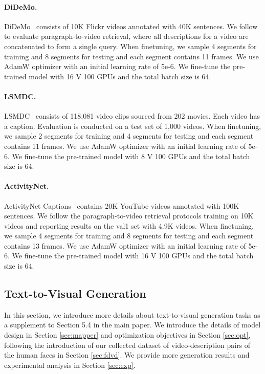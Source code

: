 \paragraph{DiDeMo.} DiDeMo~\cite{anne2017localizing} consists of 10K Flickr videos annotated with
40K sentences. We follow~\cite{liu2019use, zhang2018cross} to evaluate paragraph-to-video retrieval, where all descriptions for a video are concatenated to form a single query. When finetuning, we sample 4 segments for training and 8 segments for testing and each segment contains 11 frames. We use AdamW optimizer with an initial learning rate of 5e-6. We fine-tune the pre-trained model with 16 V 100 GPUs and the total batch size is 64.

\paragraph{LSMDC.} LSMDC~\cite{Rohrbach2016MovieD} consists of 118,081 video clips sourced from 202 movies. Each video has a caption. Evaluation is conducted on a test set of 1,000 videos. When finetuning, we sample 2 segments for training and 4 segments for testing and each segment contains 11 frames. We use AdamW optimizer with an initial learning rate of 5e-6. We fine-tune the pre-trained model with 8 V 100 GPUs and the total batch size is 64.

\paragraph{ActivityNet.} ActivityNet Captions~\cite{Krishna2017actnetcaption} contains 20K YouTube videos annotated with 100K sentences. We follow the paragraph-to-video retrieval protocols \cite{zhang2018cross,liu2019use} training on 10K videos and reporting results on the val1 set with 4.9K videos. When finetuning, we sample 4 segments for training and 8 segments for testing and each segment contains 13 frames. We use AdamW optimizer with an initial learning rate of 5e-6. We fine-tune the pre-trained model with 16 V 100 GPUs and the total batch size is 64.


\subsection{Text-to-Visual Generation}
In this section, we introduce more details about text-to-visual generation tasks as a supplement to Section 5.4 in the main paper. 
We introduce the details of model design in Section \ref{sec:mapper} and optimization objectives in Section \ref{sec:opt}, following the introduction of our collected dataset of video-description pairs of the human faces in Section \ref{sec:fdvd}. We provide more generation results and experimental analysis in Section \ref{sec:exp}.

